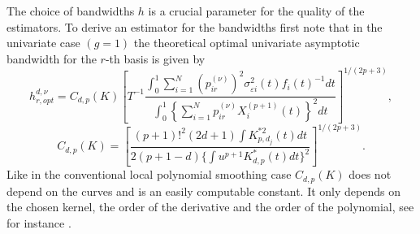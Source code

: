 \label{operbw}
The choice of bandwidths $h$ is a crucial parameter for the quality of the estimators. %
To derive an estimator for the bandwidths first note that in the univariate case $(g=1)$
the theoretical optimal univariate asymptotic bandwidth for the $r$-th basis is given by 
\begin{equation}\label{opt}
h^{d,\nu}_{r,opt} = C_{d,p}(K) \left[T^{-1}\frac{ \int_0^1 \sum_{i=1}^N (p^{(\nu)}_{ir})^2 \sigma_{\varepsilon i} ^2 (t) f_i(t)^{-1} dt}{ \int_0^1 \left\{ \sum_{i=1}^N p^{(\nu)}_{ir} X_i^{(p+1)} (t)    \right\}^2 dt} \right]^{1/(2p+3)} , %
\end{equation}
\[
C_{d,p}(K)=\left[ \frac{(p+1)!^2(2d+1) \int K^{*2}_{p,d_j}(t)dt }{2(p+1-d) \{\int u^{p+1} K_{d,p}^*(t)dt \}^2}\right]^{1/(2p+3)}.
\]
Like in the conventional local polynomial smoothing case $C_{d,p}(K)$ does not depend on the curves and is an easily computable constant. It only depends on the chosen kernel, the order of the derivative and the order of the polynomial, see for instance \cite{Fan:96}. %

